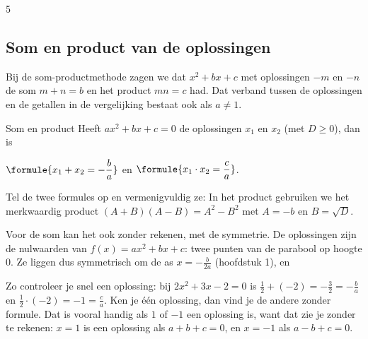 \begin{alleenvoor}{5}
\subsection{Som en product van de oplossingen}

Bij de som-productmethode zagen we dat $x^2 + bx + c$ met oplossingen $-m$ en $-n$ de som $m + n = b$ en het product $mn = c$ had. Dat verband tussen de oplossingen en de getallen in de vergelijking bestaat ook als $a \neq 1$.

\begin{theorie}
\begin{stelling}{Som en product}
Heeft $ax^2 + bx + c = 0$ de oplossingen $x_1$ en $x_2$ (met $D \geqslant 0$), dan is

\qquad $\formule{x_1 + x_2 = -\dfrac ba}$ \qquad en \qquad $\formule{x_1 \cdot x_2 = \dfrac ca}$.
\end{stelling}
\begin{bewijs}
Tel de twee formules op en vermenigvuldig ze:
In het product gebruiken we het merkwaardig product $(A + B)(A - B) = A^2 - B^2$ met $A = -b$ en $B = \sqrt D$.

Voor de som kan het ook zonder rekenen, met de symmetrie. De oplossingen zijn de nulwaarden van $f(x) = ax^2 + bx + c$: twee punten van de parabool op hoogte $0$. Ze liggen dus symmetrisch om de as $x = -\tfrac{b}{2a}$ (hoofdstuk 1), en
\end{bewijs}
\end{theorie}

Zo controleer je snel een oplossing: bij $2x^2 + 3x - 2 = 0$ is $\tfrac12 + (-2) = -\tfrac32 = -\tfrac ba$ en $\tfrac12 \cdot (-2) = -1 = \tfrac ca$. Ken je één oplossing, dan vind je de andere zonder formule. Dat is vooral handig als $1$ of $-1$ een oplossing is, want dat zie je zonder te rekenen: $x = 1$ is een oplossing als $a + b + c = 0$, en $x = -1$ als $a - b + c = 0$.


\begin{oefeningen}
\end{oefeningen}
\end{alleenvoor}

